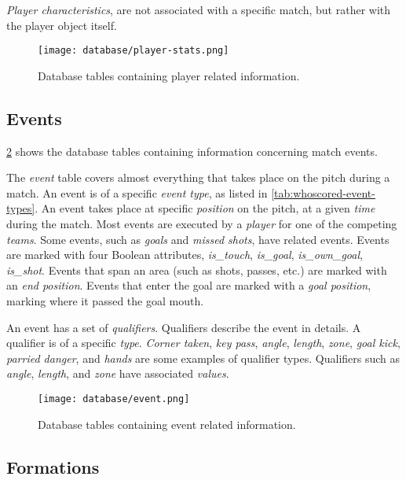 \textit{Player characteristics}, are not associated with a specific match, but rather with the player object itself.

\begin{figure}
    \centering
    \texttt{[image: database/player-stats.png]}
    \caption{Database tables containing player related information.}
    \label{fig:database-player-stats}
\end{figure}


\subsection{Events}

\cref{fig:database-events} shows the database tables containing information concerning match events.

The \textit{event} table covers almost everything that takes place on the pitch during a match. An event is of a specific \textit{event type}, as listed in \cref{tab:whoscored-event-types}. An event takes place at specific \textit{position} on the pitch, at a given \textit{time} during the match. Most events are executed by a \textit{player} for one of the competing \textit{teams}. Some events, such as \textit{goals} and \textit{missed shots}, have related events. Events are marked with four Boolean attributes, \textit{is\_touch}, \textit{is\_goal}, \textit{is\_own\_goal}, \textit{is\_shot}. Events that span an area (such as shots, passes, etc.) are marked with an \textit{end position}. Events that enter the goal are marked with a \textit{goal position}, marking where it passed the goal mouth.

An event has a set of \textit{qualifiers}. Qualifiers describe the event in details. A qualifier is of a specific \textit{type}. \textit{Corner taken}, \textit{key pass}, \textit{angle}, \textit{length}, \textit{zone}, \textit{goal kick}, \textit{parried danger}, and \textit{hands} are some examples of qualifier types. Qualifiers such as \textit{angle}, \textit{length}, and \textit{zone} have associated \textit{values}. 

\begin{figure}
    \centering
    \texttt{[image: database/event.png]}
    \caption{Database tables containing event related information.}
    \label{fig:database-events}
\end{figure}


\subsection{Formations}

